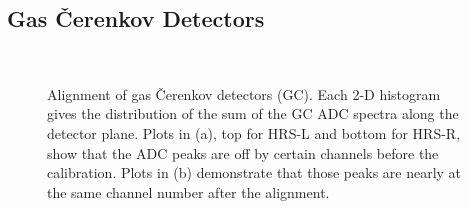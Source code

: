 \subsection{Gas \v{C}erenkov Detectors}
\begin{figure}[!ht]
  \begin{center}
    \\ 
    \caption[Alignment of gas \v{C}erenkov detectors]{\footnotesize{Alignment of gas \v{C}erenkov detectors (GC). Each 2-D histogram gives the distribution of the sum of the GC ADC spectra along the detector plane. Plots in (a), top for HRS-L and bottom for HRS-R, show that the ADC peaks are off by certain channels before the calibration. Plots in (b) demonstrate that those peaks are nearly at the same channel number after the alignment.}}
    \label{cer_align}
  \end{center}
\end{figure}

